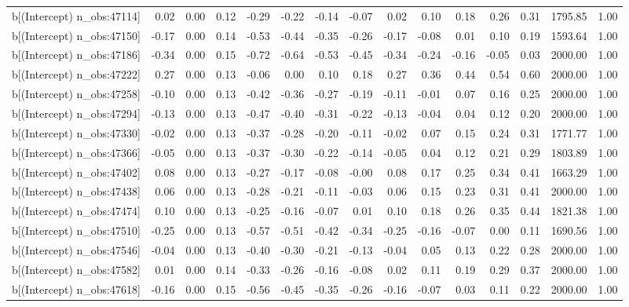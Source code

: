 \begin{table}[ht]
\begin{tabular}{rrrrrrrrrrrrrrr}
  b[(Intercept) n\_obs:47114] & 0.02 & 0.00 & 0.12 & -0.29 & -0.22 & -0.14 & -0.07 & 0.02 & 0.10 & 0.18 & 0.26 & 0.31 & 1795.85 & 1.00 \\ 
  b[(Intercept) n\_obs:47150] & -0.17 & 0.00 & 0.14 & -0.53 & -0.44 & -0.35 & -0.26 & -0.17 & -0.08 & 0.01 & 0.10 & 0.19 & 1593.64 & 1.00 \\ 
  b[(Intercept) n\_obs:47186] & -0.34 & 0.00 & 0.15 & -0.72 & -0.64 & -0.53 & -0.45 & -0.34 & -0.24 & -0.16 & -0.05 & 0.03 & 2000.00 & 1.00 \\ 
  b[(Intercept) n\_obs:47222] & 0.27 & 0.00 & 0.13 & -0.06 & 0.00 & 0.10 & 0.18 & 0.27 & 0.36 & 0.44 & 0.54 & 0.60 & 2000.00 & 1.00 \\ 
  b[(Intercept) n\_obs:47258] & -0.10 & 0.00 & 0.13 & -0.42 & -0.36 & -0.27 & -0.19 & -0.11 & -0.01 & 0.07 & 0.16 & 0.25 & 2000.00 & 1.00 \\ 
  b[(Intercept) n\_obs:47294] & -0.13 & 0.00 & 0.13 & -0.47 & -0.40 & -0.31 & -0.22 & -0.13 & -0.04 & 0.04 & 0.12 & 0.20 & 2000.00 & 1.00 \\ 
  b[(Intercept) n\_obs:47330] & -0.02 & 0.00 & 0.13 & -0.37 & -0.28 & -0.20 & -0.11 & -0.02 & 0.07 & 0.15 & 0.24 & 0.31 & 1771.77 & 1.00 \\ 
  b[(Intercept) n\_obs:47366] & -0.05 & 0.00 & 0.13 & -0.37 & -0.30 & -0.22 & -0.14 & -0.05 & 0.04 & 0.12 & 0.21 & 0.29 & 1803.89 & 1.00 \\ 
  b[(Intercept) n\_obs:47402] & 0.08 & 0.00 & 0.13 & -0.27 & -0.17 & -0.08 & -0.00 & 0.08 & 0.17 & 0.25 & 0.34 & 0.41 & 1663.29 & 1.00 \\ 
  b[(Intercept) n\_obs:47438] & 0.06 & 0.00 & 0.13 & -0.28 & -0.21 & -0.11 & -0.03 & 0.06 & 0.15 & 0.23 & 0.31 & 0.41 & 2000.00 & 1.00 \\ 
  b[(Intercept) n\_obs:47474] & 0.10 & 0.00 & 0.13 & -0.25 & -0.16 & -0.07 & 0.01 & 0.10 & 0.18 & 0.26 & 0.35 & 0.44 & 1821.38 & 1.00 \\ 
  b[(Intercept) n\_obs:47510] & -0.25 & 0.00 & 0.13 & -0.57 & -0.51 & -0.42 & -0.34 & -0.25 & -0.16 & -0.07 & 0.00 & 0.11 & 1690.56 & 1.00 \\ 
  b[(Intercept) n\_obs:47546] & -0.04 & 0.00 & 0.13 & -0.40 & -0.30 & -0.21 & -0.13 & -0.04 & 0.05 & 0.13 & 0.22 & 0.28 & 2000.00 & 1.00 \\ 
  b[(Intercept) n\_obs:47582] & 0.01 & 0.00 & 0.14 & -0.33 & -0.26 & -0.16 & -0.08 & 0.02 & 0.11 & 0.19 & 0.29 & 0.37 & 2000.00 & 1.00 \\ 
  b[(Intercept) n\_obs:47618] & -0.16 & 0.00 & 0.15 & -0.56 & -0.45 & -0.35 & -0.26 & -0.16 & -0.07 & 0.03 & 0.11 & 0.22 & 2000.00 & 1.00 \\ 

\end{tabular}
\end{table}
